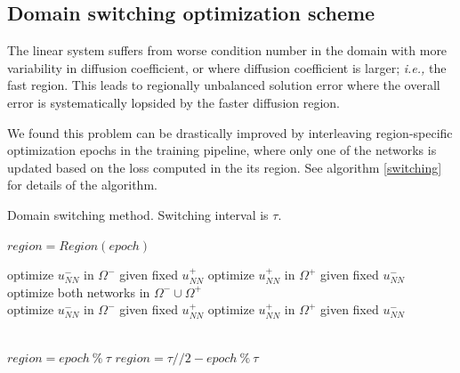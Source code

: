 \documentclass{elsarticle}
\begin{document}
\subsection{Domain switching optimization scheme}
The linear system suffers from worse condition number in the domain with more variability in diffusion coefficient, or where diffusion coefficient is larger; \textit{i.e.,} the fast region. This leads to regionally unbalanced solution error where the overall error is systematically lopsided by the faster diffusion region. 

We found this problem can be drastically improved by interleaving region-specific optimization epochs in the training pipeline, where only one of the networks is updated based on the loss computed in the its region. See algorithm \ref{switching} for details of the algorithm.

\begin{algorithm}
	\caption{Domain switching method. Switching interval is $\tau$.}\label{switching}
	\begin{algorithmic}[1]
		
			\State $region = Region (epoch)$
			
				\If {$\mu^- > \mu^+$}
					\State optimize $u^-_{NN}$ in $\Omega^-$ given fixed $u^+_{NN}$  
				\Else
					\State optimize $u^+_{NN}$ in $\Omega^+$ given fixed $u^-_{NN}$ 
				\EndIf	
			\EndIf	
			\\
				\State optimize both networks in $\Omega^- \cup \Omega^+$ 
			\EndIf	
			\\
				\If {$\mu^- < \mu^+$}
					\State optimize $u^-_{NN}$ in $\Omega^-$ given fixed $u^+_{NN}$  
				\Else
					\State optimize $u^+_{NN}$ in $\Omega^+$ given fixed $u^-_{NN}$ 
				\EndIf					
			\EndIf	
				
			
		\EndFor

		\EndProcedure
		\\
				\State $region = epoch\ \%\ \tau $ 
			\EndIf
				\State $region = \tau // 2 - epoch\ \%\ \tau  $ 
			\EndIf
		\EndProcedure
	\end{algorithmic}
\end{algorithm}
\end{document}
